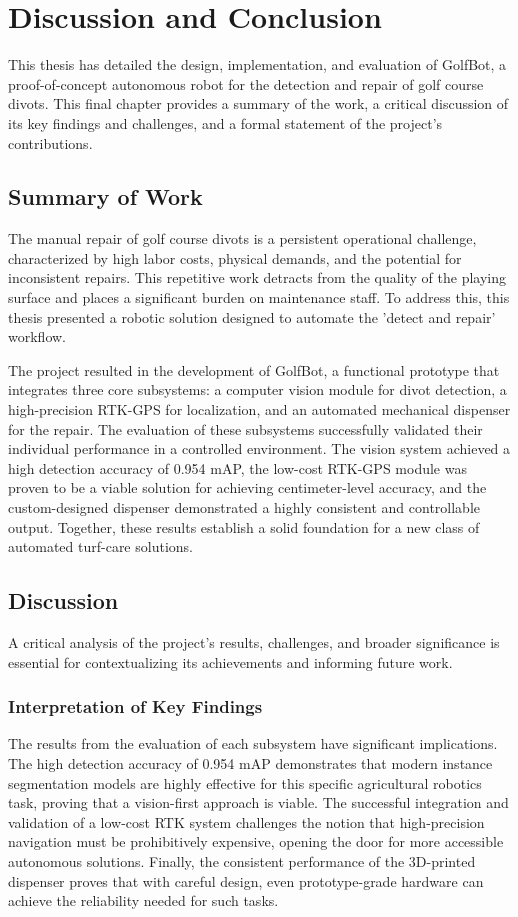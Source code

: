 \chapter{Discussion and Conclusion}
\label{chap:conclusion}

This thesis has detailed the design, implementation, and evaluation of GolfBot, a proof-of-concept autonomous robot for the detection and repair of golf course divots. This final chapter provides a summary of the work, a critical discussion of its key findings and challenges, and a formal statement of the project's contributions.

\section{Summary of Work}
The manual repair of golf course divots is a persistent operational challenge, characterized by high labor costs, physical demands, and the potential for inconsistent repairs. This repetitive work detracts from the quality of the playing surface and places a significant burden on maintenance staff. To address this, this thesis presented a robotic solution designed to automate the 'detect and repair' workflow.

The project resulted in the development of GolfBot, a functional prototype that integrates three core subsystems: a computer vision module for divot detection, a high-precision RTK-GPS for localization, and an automated mechanical dispenser for the repair. The evaluation of these subsystems successfully validated their individual performance in a controlled environment. The vision system achieved a high detection accuracy of 0.954 mAP, the low-cost RTK-GPS module was proven to be a viable solution for achieving centimeter-level accuracy, and the custom-designed dispenser demonstrated a highly consistent and controllable output. Together, these results establish a solid foundation for a new class of automated turf-care solutions.

\section{Discussion}
A critical analysis of the project's results, challenges, and broader significance is essential for contextualizing its achievements and informing future work.

\subsection{Interpretation of Key Findings}
The results from the evaluation of each subsystem have significant implications. The high detection accuracy of 0.954 mAP demonstrates that modern instance segmentation models are highly effective for this specific agricultural robotics task, proving that a vision-first approach is viable. The successful integration and validation of a low-cost RTK system challenges the notion that high-precision navigation must be prohibitively expensive, opening the door for more accessible autonomous solutions. Finally, the consistent performance of the 3D-printed dispenser proves that with careful design, even prototype-grade hardware can achieve the reliability needed for such tasks.

